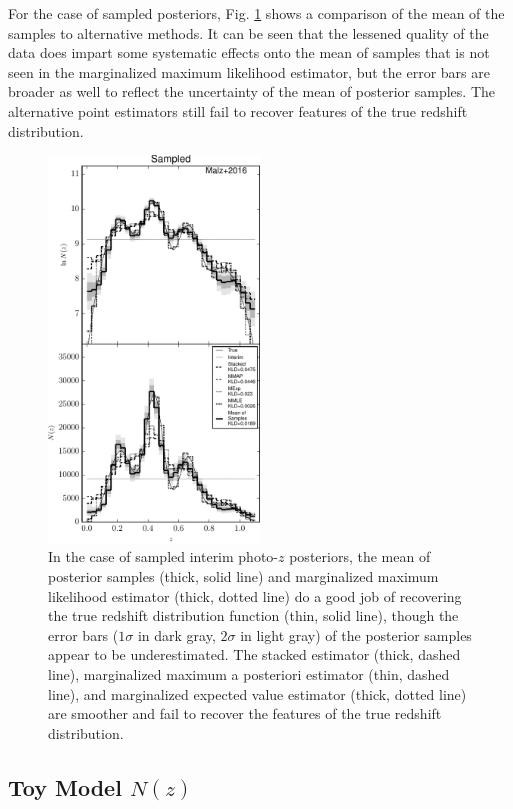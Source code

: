 \documentclass[preprint]{aastex}
\begin{document}
For the case of sampled posteriors, Fig. \ref{fig:samp-comp} shows a comparison 
of the mean of the samples to alternative methods.  It can be seen that the 
lessened quality of the data does impart some systematic effects onto the mean 
of samples that is not seen in the marginalized maximum likelihood estimator, 
but the error bars are broader as well to reflect the uncertainty of the mean 
of posterior samples.  The alternative point estimators still fail to recover 
features of the true redshift distribution.

\begin{figure}
\includegraphics[width=0.5\textwidth]{figs/samp/comps.pdf}
\caption{In the case of sampled interim photo-$z$ posteriors, the mean of 
posterior samples (thick, solid line) and marginalized maximum likelihood 
estimator (thick, dotted line) do a good job of recovering the true redshift 
distribution function (thin, solid line), though the error bars ($1\sigma$ in 
dark gray, $2\sigma$ in light gray) of the posterior samples appear to be 
underestimated.  The stacked estimator (thick, dashed line), marginalized 
maximum a posteriori estimator (thin, dashed line), and marginalized expected 
value estimator (thick, dotted line) are smoother and fail to recover the 
features of the true redshift distribution.}
\label{fig:samp-comp}
\end{figure}

\subsection{Toy Model $N(z)$}
\label{sec:fake}
\end{document}
